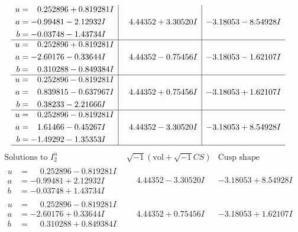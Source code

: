 \documentclass[1p]{elsarticle_modified}
\theoremstyle{definition}
\newcommand{\I}{\sqrt{-1}}
\begin{document}
$$\begin{array}{c|c|c}
\begin{aligned}
u &= \phantom{-}0.252896 + 0.819281 I \\
a &= -0.99481 - 2.12932 I \\
b &= -0.03748 - 1.43734 I\end{aligned}
 & \phantom{-}4.44352 + 3.30520 I & -3.18053 - 8.54928 I \\ \hline\begin{aligned}
u &= \phantom{-}0.252896 + 0.819281 I \\
a &= -2.60176 - 0.33644 I \\
b &= \phantom{-}0.310288 - 0.849384 I\end{aligned}
 & \phantom{-}4.44352 - 0.75456 I & -3.18053 - 1.62107 I \\ \hline\begin{aligned}
u &= \phantom{-}0.252896 - 0.819281 I \\
a &= \phantom{-}0.839815 - 0.637967 I \\
b &= \phantom{-}0.38233 - 2.21666 I\end{aligned}
 & \phantom{-}4.44352 + 0.75456 I & -3.18053 + 1.62107 I \\ \hline\begin{aligned}
u &= \phantom{-}0.252896 - 0.819281 I \\
a &= \phantom{-}1.61466 - 0.45267 I \\
b &= -1.49292 - 1.35353 I\end{aligned}
 & \phantom{-}4.44352 - 3.30520 I & -3.18053 + 8.54928 I\\
 \hline 
 \end{array}$$\newpage$$\begin{array}{c|c|c}  
\text{Solutions to }I^u_{2}& \I (\text{vol} + \sqrt{-1}CS) & \text{Cusp shape}\\
 \hline 
\begin{aligned}
u &= \phantom{-}0.252896 - 0.819281 I \\
a &= -0.99481 + 2.12932 I \\
b &= -0.03748 + 1.43734 I\end{aligned}
 & \phantom{-}4.44352 - 3.30520 I & -3.18053 + 8.54928 I \\ \hline\begin{aligned}
u &= \phantom{-}0.252896 - 0.819281 I \\
a &= -2.60176 + 0.33644 I \\
b &= \phantom{-}0.310288 + 0.849384 I\end{aligned}
 & \phantom{-}4.44352 + 0.75456 I & -3.18053 + 1.62107 I \\ \hline\begin{aligned}

\end{aligned}
\end{array}$$
\end{document}
